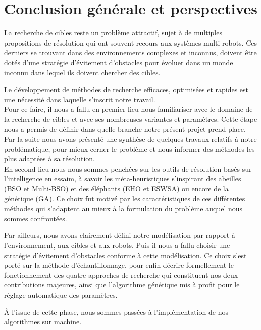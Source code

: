 \chapter*{Conclusion générale et perspectives}
 
 \label{Conclustion}
 
La recherche de cibles reste un problème attractif, sujet à de multiples propositions de résolution qui ont souvent recours aux systèmes multi-robots. Ces derniers se trouvant dans des environnements complexes et inconnus, doivent être dotés d'une stratégie d'évitement d'obstacles pour évoluer dans un monde inconnu dans lequel ils doivent chercher des cibles.

Le développement de méthodes de recherche efficaces, optimisées et rapides est une nécessité dans laquelle s'inscrit notre travail.\\


Pour ce faire, il nous a fallu en premier lieu nous familiariser avec le domaine de la recherche de cibles et avec ses nombreuses variantes et paramètres. Cette étape nous a permis de définir dans quelle branche notre présent projet prend place. Par la suite nous avons présenté une synthèse de quelques travaux relatifs à notre problématique, pour mieux cerner le problème et nous informer des méthodes les plus adaptées à sa résolution.\\

En second lieu nous nous sommes penchées sur les outils de résolution basés sur l'intelligence en essaim, à savoir les méta-heuristiques s’inspirant des abeilles (BSO et Multi-BSO) et des éléphants (EHO et ESWSA) ou encore de la génétique (GA). Ce choix fut motivé par les caractéristiques de ces différentes méthodes qui s’adaptent au mieux à la formulation du problème auquel nous sommes confrontées.

Par ailleurs, nous avons clairement défini notre modélisation par rapport à l'environnement, aux cibles et aux robots. Puis il nous a fallu choisir une stratégie d’évitement d’obstacles conforme à cette modélisation. Ce choix s’est porté sur la méthode d’échantillonnage, pour enfin décrire formellement le fonctionnement des quatre approches de recherche qui constituent nos deux contributions majeures, ainsi que  l’algorithme génétique mis à profit pour le réglage automatique des paramètres. 

À l’issue de cette phase, nous sommes passées à l’implémentation de nos algorithmes sur machine.

